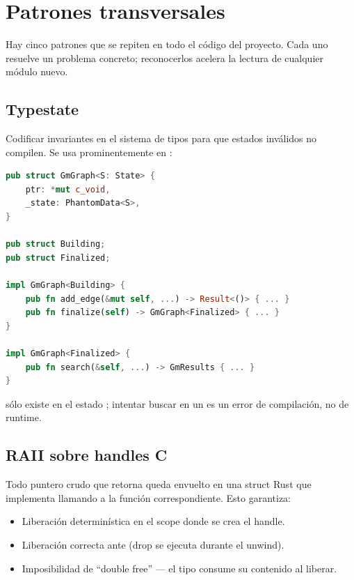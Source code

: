 \chapter{Patrones transversales}
\label{sec:patrones}

Hay cinco patrones que se repiten en todo el código del proyecto.
Cada uno resuelve un problema concreto; reconocerlos acelera la
lectura de cualquier módulo nuevo.

\section{Typestate}

Codificar invariantes en el sistema de tipos para que estados
inválidos no compilen. Se usa prominentemente en
:

\begin{lstlisting}[language=Rust]
pub struct GmGraph<S: State> {
    ptr: *mut c_void,
    _state: PhantomData<S>,
}

pub struct Building;
pub struct Finalized;

impl GmGraph<Building> {
    pub fn add_edge(&mut self, ...) -> Result<()> { ... }
    pub fn finalize(self) -> GmGraph<Finalized> { ... }
}

impl GmGraph<Finalized> {
    pub fn search(&self, ...) -> GmResults { ... }
}
\end{lstlisting}

 sólo existe en el estado ; intentar
buscar en un  es un error de compilación,
no de runtime.

\section{RAII sobre handles C}

Todo puntero crudo que retorna  queda
envuelto en una struct Rust que implementa  llamando a
la función  correspondiente. Esto garantiza:

\begin{itemize}
    \item Liberación determinística en el scope donde se crea el
    handle.
    \item Liberación correcta ante  (drop se ejecuta
    durante el unwind).
    \item Imposibilidad de ``double free'' — el tipo consume su
    contenido al liberar.
\end{itemize}

